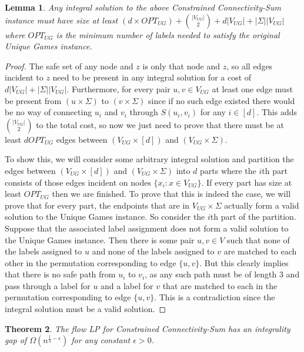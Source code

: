 \documentclass[11pt,letterpaper]{article}
\newtheorem{theorem}{Theorem}[section]
\newtheorem{lemma}[theorem]{Lemma}
\theoremstyle{definition}
\begin{document}
  \begin{lemma} \label{lem:IP_gap} Any integral solution to the above
    {\sc Constrained Connectivity-Sum} instance must have size at least $(d
    \times OPT_{UG}) + {|V_{UG}| \choose 2} + d|V_{UG}| +
    |\Sigma||V_{UG}|$ where $OPT_{UG}$ is the minimum number of labels
    needed to satisfy the original Unique Games instance.
  \end{lemma}
  \begin{proof}
    The safe set of any node and $z$ is only that node and $z$, so all
    edges incident to $z$ need to be present in any integral solution
    for a cost of $d|V_{UG}| + |\Sigma||V_{UG}|$.  Furthermore, for
    every pair $u,v \in V_{UG}$ at least one edge must be present from
    $(u \times \Sigma)$ to $(v \times \Sigma)$ since if no such edge
    existed there would be no way of connecting $u_i$ and $v_i$
    through $S(u_i, v_i)$ for any $i \in [d]$.  This adds ${|V_{UG}|
      \choose 2}$ to the total cost, so now we just need to prove that
    there must be at least $d OPT_{UG}$ edges between $(V_{UG} \times
    [d])$ and $(V_{UG} \times \Sigma)$.

    To show this, we will consider some arbitrary integral solution
    and partition the edges between $(V_{UG} \times [d])$ and $(V_{UG}
    \times \Sigma)$ into $d$ parts where the $i$th part consists of
    those edges incident on nodes $\{x_i : x \in V_{UG}\}$.  If every
    part has size at least $OPT_{UG}$ then we are finished.  To prove
    that this is indeed the case, we will prove that for every part,
    the endpoints that are in $V_{UG} \times \Sigma$ actually form a
    valid solution to the Unique Games instance.  So consider the
    $i$th part of the partition.  Suppose that the associated label
    assignment does not form a valid solution to the Unique Games
    instance.  Then there is some pair $u,v \in V$ such that none of
    the labels assigned to $u$ and none of the labels assigned to $v$
    are matched to each other in the permutation corresponding to edge
    $\{u,v\}$.  But this clearly implies that there is no safe path
    from $u_i$ to $v_i$, as any such path must be of length $3$ and
    pass through a label for $u$ and a label for $v$ that are matched
    to each in the permutation corresponding to edge $\{u,v\}$.  This
    is a contradiction since the integral solution must be a valid
    solution.
  \end{proof}



  \begin{theorem} \label{thm:gap} The flow LP for {\sc Constrained Connectivity-Sum} has an integrality gap
    of $\Omega(n^{\frac{1}{3} - \epsilon})$ for any constant $\epsilon
    > 0$.
  \end{theorem}
\end{document}
